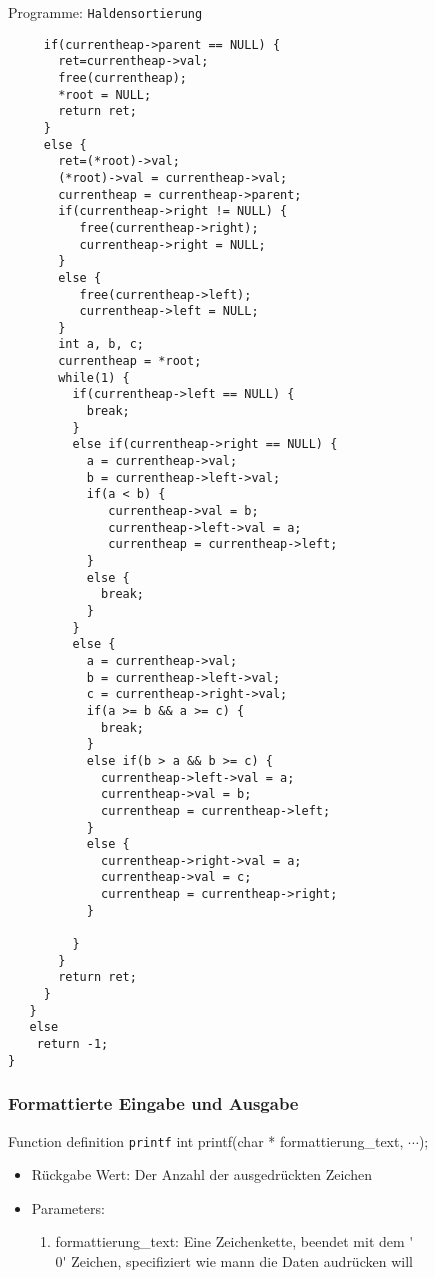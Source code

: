 \begin{myexampleprogram}{Programme: \texttt{Haldensortierung}}
\begin{lstlisting}
     if(currentheap->parent == NULL) {
       ret=currentheap->val;
       free(currentheap);
       *root = NULL;
       return ret;
     }
     else {
       ret=(*root)->val;
       (*root)->val = currentheap->val;
       currentheap = currentheap->parent;
       if(currentheap->right != NULL) {
          free(currentheap->right);
          currentheap->right = NULL;
       }
       else {
          free(currentheap->left);
          currentheap->left = NULL;
       }
       int a, b, c;
       currentheap = *root;
       while(1) {
         if(currentheap->left == NULL) {
           break;
         }
         else if(currentheap->right == NULL) {
           a = currentheap->val;
           b = currentheap->left->val;
           if(a < b) {
              currentheap->val = b;
              currentheap->left->val = a;
              currentheap = currentheap->left;
           }
           else {
             break;
           }
         }
         else {
           a = currentheap->val;
           b = currentheap->left->val;
           c = currentheap->right->val;
           if(a >= b && a >= c) {
             break;
           }
           else if(b > a && b >= c) {
             currentheap->left->val = a;
             currentheap->val = b;
             currentheap = currentheap->left;
           }
           else {
             currentheap->right->val = a;
             currentheap->val = c;
             currentheap = currentheap->right;
           }

         }
       }
       return ret;
     }
   }
   else
    return -1;
}
\end{lstlisting}
\end{myexampleprogram}
\subsubsection{Formattierte Eingabe und Ausgabe}
\begin{myexampleblock}{Function definition \texttt{printf}}
int printf(char * formattierung\_text, $\cdots$);
\begin{itemize}
\item Rückgabe Wert: Der Anzahl der ausgedrückten Zeichen
\item Parameters:
\begin{enumerate}
\item formattierung\_text: Eine Zeichenkette, beendet mit dem \'{}\\0\'{} Zeichen, specifiziert wie mann die Daten
audrücken will
\end{enumerate}
\end{itemize}
\end{myexampleblock}
\pagebreak
